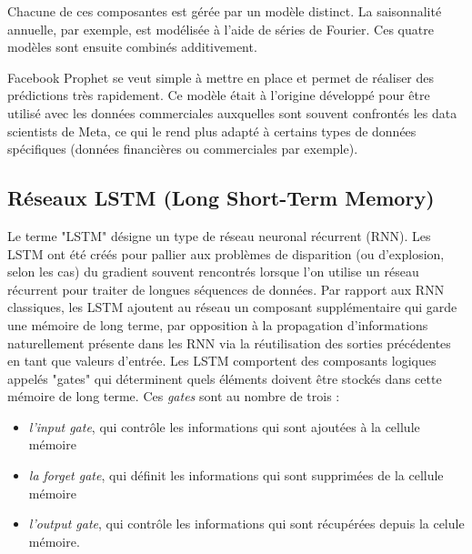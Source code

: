 \documentclass[french]{article}
\begin{document}
    Chacune de ces composantes est gérée par un modèle distinct. La saisonnalité annuelle, par exemple, est modélisée à l'aide de séries de Fourier. Ces quatre modèles sont ensuite combinés additivement.
    
    Facebook Prophet se veut simple à mettre en place et permet de réaliser des prédictions très rapidement. Ce modèle était à l'origine développé pour être utilisé avec les données commerciales auxquelles sont souvent confrontés les data scientists de Meta, ce qui le rend plus adapté à certains types de données spécifiques (données financières ou commerciales par exemple). 
    
    \subsection{Réseaux LSTM (Long Short-Term Memory)}

    Le terme "LSTM" désigne un type de réseau neuronal récurrent (RNN). Les LSTM ont été créés pour pallier aux problèmes de disparition (ou d'explosion, selon les cas) du gradient souvent rencontrés lorsque l'on utilise un réseau récurrent pour traiter de longues séquences de données.
    Par rapport aux RNN classiques, les LSTM ajoutent au réseau un composant supplémentaire qui garde une mémoire de long terme, par opposition à la propagation d'informations naturellement présente dans les RNN via la réutilisation des sorties précédentes en tant que valeurs d'entrée. Les LSTM comportent des composants logiques appelés "gates" qui déterminent quels éléments doivent être stockés dans cette mémoire de long terme. Ces \textit{gates} sont au nombre de trois :
    \begin{itemize}
        \item \textit{l'input gate}, qui contrôle les informations qui sont ajoutées à la cellule mémoire
        \item \textit{la forget gate}, qui définit les informations qui sont supprimées de la cellule mémoire
        \item \textit{l'output gate}, qui contrôle les informations qui sont récupérées depuis la celule mémoire.
    \end{itemize}
\end{document}

